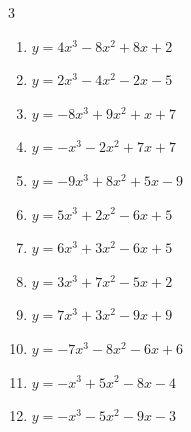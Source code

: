 \begin{multicols}{3}
\begin{enumerate}
  \item $y=4x^{3}-8x^{2}+8x+2$


\columnbreak %

  \item $y=2x^{3}-4x^{2}-2x-5$


  \item $y=-8x^{3}+9x^{2}+x+7$


  \item $y=-x^{3}-2x^{2}+7x+7$


  \item $y=-9x^{3}+8x^{2}+5x-9$


  \item $y=5x^{3}+2x^{2}-6x+5$


  \item $y=6x^{3}+3x^{2}-6x+5$


  \item $y=3x^{3}+7x^{2}-5x+2$


  \item $y=7x^{3}+3x^{2}-9x+9$


  \item $y=-7x^{3}-8x^{2}-6x+6$


  \item $y=-x^{3}+5x^{2}-8x-4$


  \item $y=-x^{3}-5x^{2}-9x-3$



\end{enumerate}
\end{multicols}
